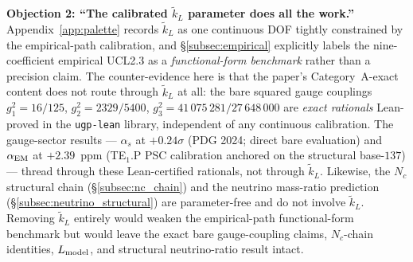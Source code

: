 \documentclass[11pt]{article}
\theoremstyle{remark}
\begin{document}
\begin{tcolorbox}[colback=gray!5,colframe=gray!55!black,
  title={\textbf{Two Common Objections, Addressed Up Front}},
  fonttitle=\bfseries,left=5pt,right=5pt,top=4pt,bottom=4pt,breakable]
\smallskip
\noindent\textbf{Objection 2: ``The calibrated $\tilde{k}_L$ parameter does all the work.''}  Appendix~\ref{app:palette} records $\tilde{k}_L$ as one continuous DOF tightly constrained by the empirical-path calibration, and \S\ref{subsec:empirical} explicitly labels the nine-coefficient empirical UCL2.3 as a \emph{functional-form benchmark} rather than a precision claim.  The counter-evidence here is that the paper's Category~A-exact content does not route through $\tilde{k}_L$ at all: the bare squared gauge couplings $g_1^2 = 16/125$, $g_2^2 = 2329/5400$, $g_3^2 = 41\,075\,281/27\,648\,000$ are \emph{exact rationals} Lean-proved in the \texttt{ugp-lean} library, independent of any continuous calibration.  The gauge-sector results --- $\alpha_s$ at $+0.24\sigma$ (PDG 2024; direct bare evaluation) and $\alpha_{\rm EM}$ at $+2.39$~ppm (TE$_1$.P PSC calibration anchored on the structural base-$137$) --- thread through these Lean-certified rationals, not through $\tilde{k}_L$.  Likewise, the $N_c$ structural chain (\S\ref{subsec:nc_chain}) and the neutrino mass-ratio prediction (\S\ref{subsec:neutrino_structural}) are parameter-free and do not involve $\tilde{k}_L$.  Removing $\tilde{k}_L$ entirely would weaken the empirical-path functional-form benchmark but would leave the exact bare gauge-coupling claims, $N_c$-chain identities, $L_{\rm model}$, and structural neutrino-ratio result intact.


\end{tcolorbox}
\end{document}
